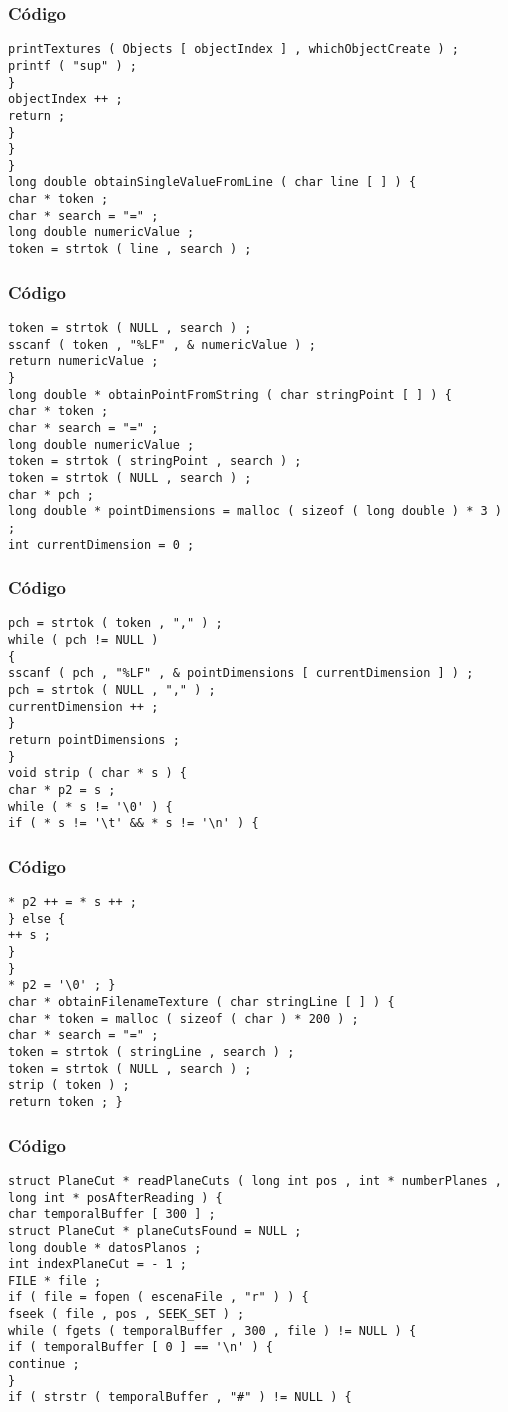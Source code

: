 \documentclass{beamer}
\begin{document}
\begin{frame}[fragile]
\frametitle{C\'odigo}
\begin{verbatim}
printTextures ( Objects [ objectIndex ] , whichObjectCreate ) ; 
printf ( "sup" ) ; 
} 
objectIndex ++ ; 
return ; 
} 
} 
} 
long double obtainSingleValueFromLine ( char line [ ] ) { 
char * token ; 
char * search = "=" ; 
long double numericValue ; 
token = strtok ( line , search ) ; 
\end{verbatim}
\end{frame}
\begin{frame}[fragile]
\frametitle{C\'odigo}
\begin{verbatim}
token = strtok ( NULL , search ) ; 
sscanf ( token , "%LF" , & numericValue ) ; 
return numericValue ; 
} 
long double * obtainPointFromString ( char stringPoint [ ] ) { 
char * token ; 
char * search = "=" ; 
long double numericValue ; 
token = strtok ( stringPoint , search ) ; 
token = strtok ( NULL , search ) ; 
char * pch ; 
long double * pointDimensions = malloc ( sizeof ( long double ) * 3 ) ; 
int currentDimension = 0 ; 
\end{verbatim}
\end{frame}
\begin{frame}[fragile]
\frametitle{C\'odigo}
\begin{verbatim}
pch = strtok ( token , "," ) ; 
while ( pch != NULL ) 
{ 
sscanf ( pch , "%LF" , & pointDimensions [ currentDimension ] ) ; 
pch = strtok ( NULL , "," ) ; 
currentDimension ++ ; 
} 
return pointDimensions ; 
} 
void strip ( char * s ) { 
char * p2 = s ; 
while ( * s != '\0' ) { 
if ( * s != '\t' && * s != '\n' ) { 
\end{verbatim}
\end{frame}
\begin{frame}[fragile]
\frametitle{C\'odigo}
\begin{verbatim}
* p2 ++ = * s ++ ; 
} else { 
++ s ; 
} 
} 
* p2 = '\0' ; } 
char * obtainFilenameTexture ( char stringLine [ ] ) { 
char * token = malloc ( sizeof ( char ) * 200 ) ; 
char * search = "=" ; 
token = strtok ( stringLine , search ) ; 
token = strtok ( NULL , search ) ; 
strip ( token ) ; 
return token ; } 
\end{verbatim}
\end{frame}
\begin{frame}[fragile]
\frametitle{C\'odigo}
\begin{verbatim}
struct PlaneCut * readPlaneCuts ( long int pos , int * numberPlanes , long int * posAfterReading ) { 
char temporalBuffer [ 300 ] ; 
struct PlaneCut * planeCutsFound = NULL ; 
long double * datosPlanos ; 
int indexPlaneCut = - 1 ; 
FILE * file ; 
if ( file = fopen ( escenaFile , "r" ) ) { 
fseek ( file , pos , SEEK_SET ) ; 
while ( fgets ( temporalBuffer , 300 , file ) != NULL ) { 
if ( temporalBuffer [ 0 ] == '\n' ) { 
continue ; 
} 
if ( strstr ( temporalBuffer , "#" ) != NULL ) { 
\end{verbatim}
\end{frame}
\end{document}
